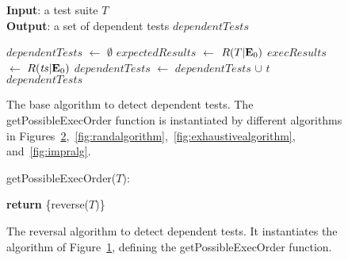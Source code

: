 \begin{figure}[t]
\textbf{Input}: a test suite $\mathit{T}$\\
\textbf{Output}: a set of dependent tests $\mathit{dependentTests}$\\
\vspace{-5mm}
\begin{algorithmic}[1]
\STATE $\mathit{dependentTests}$ $\leftarrow$ $\emptyset$
\STATE $\mathit{expectedResults}$ $\leftarrow$ $R(T|\mathbf{E}_0)$
\STATE $\mathit{execResults}$ $\leftarrow$ $R(\mathit{ts}|\mathbf{E}_0)$
\STATE $\mathit{dependentTests}$ $\leftarrow$ $\mathit{dependentTests}$ $\cup$ $\mathit{t}$
\ENDIF
\ENDFOR
\ENDFOR
\RETURN $\mathit{dependentTests}$
\end{algorithmic}


\vspace{-3mm}
\caption {The base algorithm to detect dependent tests.
$\!$The getPossibleExecOrder function is instantiated
by different algorithms in
Figures~\ref{fig:reversal-algorithm},~$\!$\ref{fig:randalgorithm},~$\!$\ref{fig:exhaustivealgorithm},
and~\ref{fig:impralg}.
}
\label{fig:basealgorithm}
\end{figure}

\begin{figure}[t]
getPossibleExecOrder($T$):\\
\vspace{-5mm}
\begin{algorithmic}[1]
\STATE \textbf{return} \{reverse($T$)\}
\end{algorithmic}

\vspace{-3mm}
\caption {The reversal algorithm to detect dependent tests.
It instantiates the algorithm of Figure~\ref{fig:basealgorithm},
defining the getPossibleExecOrder function.
}
\label{fig:reversal-algorithm}
\end{figure}


